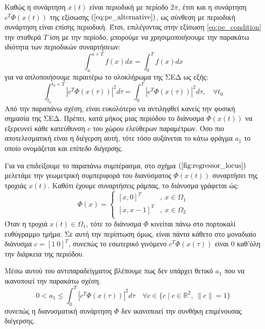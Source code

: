 Καθώς η συνάρτηση $x(t)$ είναι περιοδική με περίοδο $2\pi$, έτσι και η συνάρτηση $c^T \varPhi(x(t))$ της εξίσωσης $(\ref{eq:pe_alternative})$, ως σύνθεση με περιοδική συνάρτηση είναι επίσης περιοδική. Έτσι, επιλέγοντας στην εξίσωση \eqref{eq:pe_condition} την σταθερά $T$ ίση με την περίοδο, μπορούμε να χρησιμοποιήσουμε την παρακάτω ιδιότητα των περιοδικών συναρτήσεων:
\begin{equation*}
	\int_{a}^{a+T} f(x) dx = \int_{0}^{T} f(x) dx
\end{equation*}
για να απλοποιήσουμε περαιτέρω το ολοκλήρωμα της ΣΕΔ ως εξής:
\begin{equation*}
\int_{t_0}^{t_0 + T} \left| c^T \varPhi(x(\tau)) \right|^2 d\tau = 
\int_{0}^{T} \left| c^T \varPhi(x(\tau)) \right|^2 d\tau, \quad \forall t_0
\end{equation*}
Από την παραπάνω σχέση, είναι ευκολότερο να αντιληφθεί κανείς την φυσική σημασία της ΣΕΔ. Πρέπει, κατά μήκος μιας περιόδου το διάνυσμα $\varPhi(x(t))$ να εξερευνεί κάθε κατεύθυνση $c$ του χώρου ελεύθερων παραμέτρων. Όσο πιο αποτελεσματική είναι η διέγερση αυτή, τότε τόσο αυξάνεται το κάτω φράγμα $a_1$ το οποίο ονομάζεται και \textit{επίπεδο διέγερσης}.

Για να επιδείξουμε το παραπάνω συμπέρασμα, στο σχήμα $(\ref{fig:regressor_locus})$ μελετάμε την γεωμετρική συμπεριφορά του διανύσματος $\varPhi(x(t))$ συναρτήσει της τροχιάς $x(t)$. Καθότι έχουμε συναρτήσεις ράμπας, το διάνυσμα γράφεται ώς:
\begin{equation*}
	\varPhi(x) = 
	\begin{cases}
	[x, 0]^T    &, \: x \in \Omega_1\\
	[x,x-1]^T &, \: x \in \Omega_2\\
	\end{cases}
\end{equation*}
Όταν η τροχιά $x(t) \in \Omega_1$, τότε το διάνυσμα $\varPhi$ κινείται πάνω στο πορτοκαλί ευθύγραμμο τμήμα. Σε αυτή την περίπτωση όμως, είναι πάντα κάθετο στο μοναδιαίο διάνυσμα $c = [ 1 \: 0 ]^T$, συνεπώς το εσωτερικό γινόμενο $c^T \varPhi(x(\tau))$ είναι $0$ καθ'όλη την διάρκεια της περιόδου. 

Μέσω αυτού του αντιπαραδείγματος βλέπουμε πως δεν υπάρχει θετικό $a_1$ που να ικανοποιεί την παρακάτω σχέση.
\begin{equation*}
	0 < a_1 \leq \int_{0}^{T} \left| c^T \varPhi(x(\tau)) \right|^2 d\tau \quad
	\forall c \in
	\{c \mid c \in \mathbb{R}^2, \: \|c\| =1 \}
\end{equation*}
συνεπώς η διανυσματική συνάρτηση $\varPhi$ δεν ικανοποιεί την συνθήκη επιμένουσας διέγερσης.

